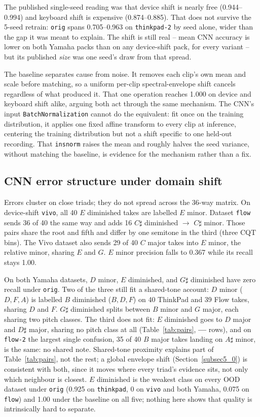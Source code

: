 \documentclass[pdflatex,sn-mathphys-num,iicol]{sn-jnl}
\theoremstyle{thmstyleone}
\theoremstyle{thmstyletwo}
\theoremstyle{thmstylethree}
\begin{document}
The published single-seed reading was that device shift is nearly free (0.944--0.994) and keyboard shift is expensive (0.874--0.885). That does not survive the 5-seed retrain: \texttt{orig} spans 0.705--0.963 on \texttt{thinkpad-2} by seed alone, wider than the gap it was meant to explain. The shift is still real -- mean CNN accuracy is lower on both Yamaha packs than on any device-shift pack, for every variant -- but its published \emph{size} was one seed's draw from that spread.

The baseline separates cause from noise. It removes each clip's own mean and scale before matching, so a uniform per-clip spectral-envelope shift cancels regardless of what produced it. That one operation reaches 1.000 on device and keyboard shift alike, arguing both act through the same mechanism. The CNN's input \texttt{BatchNormalization} cannot do the equivalent: fit once on the training distribution, it applies one fixed affine transform to every clip at inference, centering the training distribution but not a shift specific to one held-out recording. That \texttt{insnorm} raises the mean and roughly halves the seed variance, without matching the baseline, is evidence for the mechanism rather than a fix.

\subsection{CNN error structure under domain shift}\label{subsec5_1}

Errors cluster on close triads; they do not spread across the 36-way matrix. On device-shift \texttt{vivo}, all 40 $E$ diminished takes are labelled $E$ minor. Dataset \texttt{flow} sends 36 of 40 the same way and adds 16 $C\sharp$ diminished $\to$ $C\sharp$ minor. Those pairs share the root and fifth and differ by one semitone in the third (three CQT bins). The Vivo dataset also sends 29 of 40 $C$ major takes into $E$ minor, the relative minor, sharing $E$ and $G$. $E$ minor precision falls to 0.367 while its recall stays 1.00.

On both Yamaha datasets, $D$ minor, $E$ diminished, and $G\sharp$ diminished have zero recall under \texttt{orig}. Two of the three still fit a shared-tone account: $D$ minor ($D,F,A$) is labelled $B$ diminished ($B,D,F$) on 40 ThinkPad and 39 Flow takes, sharing $D$ and $F$. $G\sharp$ diminished splits between $B$ minor and $G$ major, each sharing two pitch classes. The third does not fit: $E$ diminished goes to $D$ major and $D\sharp$ major, sharing no pitch class at all (Table~\ref{tab:pairs}, \textbf{---} rows), and on \texttt{flow-2} the largest single confusion, 35 of 40 $B$ major takes landing on $A\sharp$ minor, is the same: no shared note. Shared-tone proximity explains part of Table~\ref{tab:pairs}, not the rest; a global envelope shift (Section~\ref{subsec5_0}) is consistent with both, since it moves where every triad's evidence sits, not only which neighbour is closest. $E$ diminished is the weakest class on every OOD dataset under \texttt{orig} (0.925 on \texttt{thinkpad}, 0 on \texttt{vivo} and both Yamaha, 0.075 on \texttt{flow}) and 1.00 under the baseline on all five; nothing here shows that quality is intrinsically hard to separate.
\end{document}
